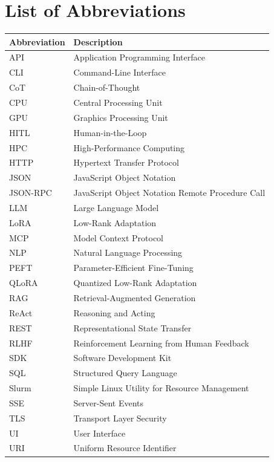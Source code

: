 \chapter*{List of Abbreviations}

\begin{longtable}{|l|p{10cm}|}
\hline
\textbf{Abbreviation} & \textbf{Description} \\
\hline
\endhead

API & Application Programming Interface \\
\hline
CLI & Command-Line Interface \\
\hline
CoT & Chain-of-Thought \\
\hline
CPU & Central Processing Unit \\
\hline
GPU & Graphics Processing Unit \\
\hline
HITL & Human-in-the-Loop \\
\hline
HPC & High-Performance Computing \\
\hline
HTTP & Hypertext Transfer Protocol \\
\hline
JSON & JavaScript Object Notation \\
\hline
JSON-RPC & JavaScript Object Notation Remote Procedure Call \\
\hline
LLM & Large Language Model \\
\hline
LoRA & Low-Rank Adaptation \\
\hline
MCP & Model Context Protocol \\
\hline
NLP & Natural Language Processing \\
\hline
PEFT & Parameter-Efficient Fine-Tuning \\
\hline
QLoRA & Quantized Low-Rank Adaptation \\
\hline
RAG & Retrieval-Augmented Generation \\
\hline
ReAct & Reasoning and Acting \\
\hline
REST & Representational State Transfer \\
\hline
RLHF & Reinforcement Learning from Human Feedback \\
\hline
SDK & Software Development Kit \\
\hline
SQL & Structured Query Language \\
\hline
Slurm & Simple Linux Utility for Resource Management \\
\hline
SSE & Server-Sent Events \\
\hline
TLS & Transport Layer Security \\
\hline
UI & User Interface \\
\hline
URI & Uniform Resource Identifier \\
\hline

\end{longtable}

